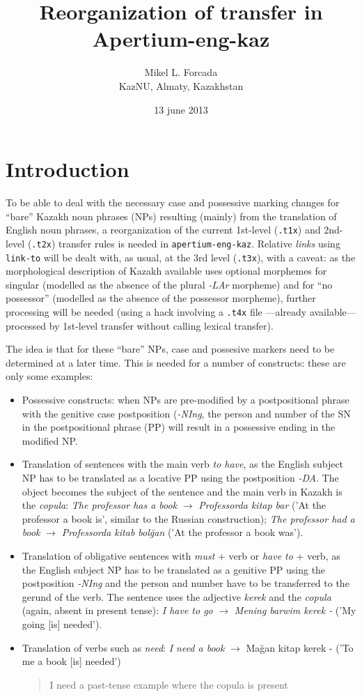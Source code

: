 \documentclass{article}
\title{Reorganization of transfer in Apertium-eng-kaz}
\author{Mikel L. Forcada \\ KazNU, Almaty, Kazakhstan}
\date{13 june 2013}
\newcommand{\com}[1]{\begin{quote}\begin{sf}#1\end{sf}\end{quote}}
\begin{document}
\maketitle

\section{Introduction}
To be able to deal with the necessary case and possessive marking changes for ``bare'' Kazakh noun phrases (NPs) resulting (mainly) from the translation of English noun phrases, a reorganization of the current 1st-level (\texttt{.t1x}) and 2nd-level (\texttt{.t2x}) transfer rules is needed in \texttt{apertium-eng-kaz}. Relative \emph{links} using \texttt{link-to} will be dealt with, as usual, at the 3rd level (\texttt{.t3x}), with a caveat: as the morphological description of Kazakh available uses optional morphemes for singular (modelled as the absence of the plural \emph{-LAr} morpheme) and for ``no possessor'' (modelled as the absence of the possessor morpheme), further processing will be needed (using a hack involving a \texttt{.t4x} file ---already available--- processed by 1st-level transfer without calling lexical transfer). 

The idea is that for these ``bare'' NPs, case and possesive markers need to be determined at a later time. This is needed for a number of constructs: these are only some examples:
\begin{itemize}
\item Possessive constructs: when NPs are pre-modified by a postpositional phrase with the genitive case postposition (\emph{-NIng}, the person and number of the SN in the postpositional phrase (PP) will result in a possessive ending in the modified NP.
\item Translation of sentences with the main verb \emph{to have}, as the English subject NP has to be translated as a locative PP using the postposition \emph{-DA}. The object becomes the subject of the sentence and the main verb in Kazakh is the \emph{copula}:
\emph{The professor has a book} \(\to\) \emph{Professorda kitap bar} ('At the professor a book is',  similar to the Russian construction); \emph{The professor had a book} \(\to\) \emph{Professorda kitab bol\u{g}an} ('At the professor a book was').
\item Translation of obligative sentences with \emph{must} + verb or \emph{have to} + verb, as the English subject NP has to be translated as a genitive PP using the postposition \emph{-NIng} and the person and  number have to be transferred to the gerund of the verb. The sentence uses the adjective \emph{kerek} and the \emph{copula} (again, absent in present tense):
\emph{I have to go} \(\to\) \emph{Mening barwim kerek -} ('My going [is] needed').
\item Translation of verbs such as \emph{need}: \emph{I need a book} \(\to\) {Ma\u{g}an kitap kerek -} ('To me a book [is] needed')
\com{I need a past-tense example where the copula is present}
\end{itemize}
\com{[The last list may be completed]}
\end{document}
